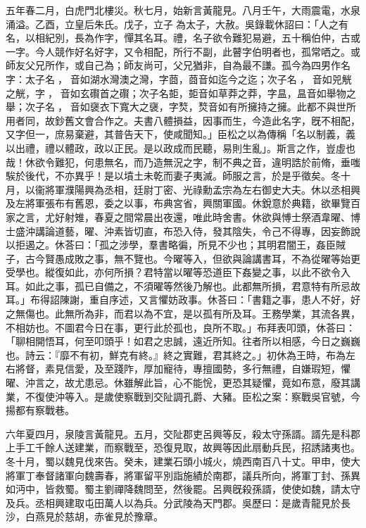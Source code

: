 \begin{pinyinscope}
五年春二月，白虎門北樓災。秋七月，始新言黃龍見。八月壬午，大雨震電，水泉涌溢。乙酉，立皇后朱氏。戊子，立子𩅦為太子，大赦。吳錄載休詔曰：「人之有名，以相紀別，長為作字，憚其名耳。禮，名子欲令難犯易避，五十稱伯仲，古或一字。今人競作好名好字，又令相配，所行不副，此瞽字伯明者也，孤常哂之。或師友父兄所作，或自己為；師友尚可，父兄猶非，自為最不謙。孤今為四男作名字：太子名𩅦，𩅦音如湖水灣澳之灣，字莔，莔音如迄今之迄；次子名𩃙，𩃙音如兕觥之觥，字𧟨，𧟨音如玄礥首之礥；次子名壾，壾音如草莽之莽，字昷，昷音如舉物之舉；次子名𠅬，𠅬音如襃衣下寬大之襃，字㷏，㷏音如有所擁持之擁。此都不與世所用者同，故鈔舊文會合作之。夫書八體損益，因事而生，今造此名字，旣不相配，又字但一，庶易棄避，其普告天下，使咸聞知。」臣松之以為傳稱「名以制義，義以出禮，禮以體政，政以正民。是以政成而民聽，易則生亂」。斯言之作，豈虛也哉！休欲令難犯，何患無名，而乃造無況之字，制不典之音，違明誥於前脩，垂嗤騃於後代，不亦異乎！是以墳土未乾而妻子夷滅。師服之言，於是乎徵矣。冬十月，以衞將軍濮陽興為丞相，廷尉丁密、光祿勳孟宗為左右御史大夫。休以丞相興及左將軍張布有舊恩，委之以事，布典宮省，興關軍國。休銳意於典籍，欲畢覽百家之言，尤好射雉，春夏之間常晨出夜還，唯此時舍書。休欲與愽士祭酒韋曜、博士盛沖講論道藝，曜、沖素皆切直，布恐入侍，發其陰失，令己不得專，因妄飾說以拒遏之。休荅曰：「孤之涉學，羣書略徧，所見不少也；其明君闇王，姦臣賊子，古今賢愚成敗之事，無不覽也。今曜等入，但欲與論講書耳，不為從曜等始更受學也。縱復如此，亦何所損？君特當以曜等恐道臣下姦變之事，以此不欲令入耳。如此之事，孤已自備之，不須曜等然後乃解也。此都無所損，君意特有所忌故耳。」布得詔陳謝，重自序述，又言懼妨政事。休荅曰：「書籍之事，患人不好，好之無傷也。此無所為非，而君以為不宜，是以孤有所及耳。王務學業，其流各異，不相妨也。不圖君今日在事，更行此於孤也，良所不取。」布拜表叩頭，休荅曰：「聊相開悟耳，何至叩頭乎！如君之忠誠，遠近所知。往者所以相感，今日之巍巍也。詩云：『靡不有初，鮮克有終。』終之實難，君其終之。」初休為王時，布為左右將督，素見信愛，及至踐阼，厚加寵待，專擅國勢，多行無禮，自嫌瑕短，懼曜、沖言之，故尤患忌。休雖解此旨，心不能恱，更恐其疑懼，竟如布意，廢其講業，不復使沖等入。是歲使察戰到交阯調孔爵、大豬。臣松之案：察戰吳官號，今揚都有察戰巷。

六年夏四月，泉陵言黃龍見。五月，交阯郡吏呂興等反，殺太守孫諝。諝先是科郡上手工千餘人送建業，而察戰至，恐復見取，故興等因此扇動兵民，招誘諸夷也。冬十月，蜀以魏見伐來告。癸未，建業石頭小城火，燒西南百八十丈。甲申，使大將軍丁奉督諸軍向魏壽春，將軍留平別詣施績於南郡，議兵所向，將軍丁封、孫異如沔中，皆救蜀。蜀主劉禪降魏問至，然後罷。呂興旣殺孫諝，使使如魏，請太守及兵。丞相興建取屯田萬人以為兵。分武陵為天門郡。吳歷曰：是歲青龍見於長沙，白燕見於慈胡，赤雀見於豫章。


\end{pinyinscope}
